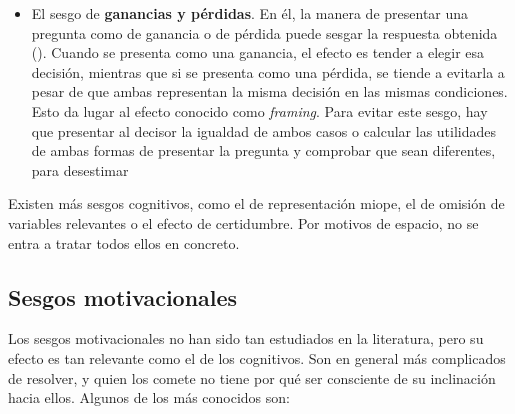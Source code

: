 \documentclass[a4paper,11pt]{article}
\begin{document}
\begin{itemize}
\item El sesgo de \textbf{ganancias y pérdidas}. En él, la manera de presentar una pregunta como de ganancia o de pérdida puede sesgar la respuesta obtenida (\cite{tversky1981}). Cuando se presenta como una ganancia, el efecto es tender a elegir esa decisión, mientras que si se presenta como una pérdida, se tiende a evitarla a pesar de que ambas representan la misma decisión en las mismas condiciones. Esto da lugar al efecto conocido como \textit{framing}. Para evitar este sesgo, hay que presentar al decisor la igualdad de ambos casos o calcular las utilidades de ambas formas de presentar la pregunta y comprobar que sean diferentes, para desestimar

\end{itemize}

Existen más sesgos cognitivos, como el de representación miope, el de omisión de variables relevantes o el efecto de certidumbre. Por motivos de espacio, no se entra a tratar todos ellos en concreto.
\subsection{Sesgos motivacionales}
Los sesgos motivacionales no han sido tan estudiados en la literatura, pero su efecto es tan relevante como el de los cognitivos. Son en general más complicados de resolver, y quien los comete no tiene por qué ser consciente de su inclinación hacia ellos. Algunos de los más conocidos son:
\end{document}
